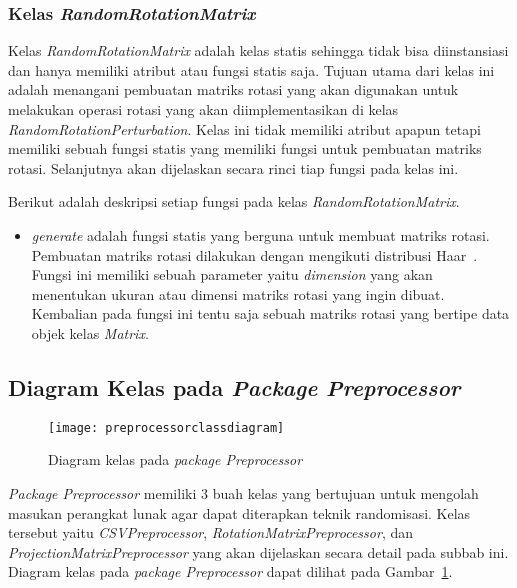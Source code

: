 \subsubsection{Kelas \textit{RandomRotationMatrix}}
\label{subsubsec:kelas-rrm}

Kelas \textit{RandomRotationMatrix} adalah kelas statis sehingga tidak bisa diinstansiasi dan hanya memiliki atribut atau fungsi statis saja. Tujuan utama dari kelas ini adalah menangani pembuatan matriks rotasi yang akan digunakan untuk melakukan operasi rotasi yang akan diimplementasikan di kelas \textit{RandomRotationPerturbation}. Kelas ini tidak memiliki atribut apapun tetapi memiliki sebuah fungsi statis yang memiliki fungsi untuk pembuatan matriks rotasi. Selanjutnya akan dijelaskan secara rinci tiap fungsi pada kelas ini.

Berikut adalah deskripsi setiap fungsi pada kelas \textit{RandomRotationMatrix}.
\begin{itemize}
	\item \textit{generate} adalah fungsi statis yang berguna untuk membuat matriks rotasi. Pembuatan matriks rotasi dilakukan dengan mengikuti distribusi Haar~\cite{stewart:80:orthogonal}. Fungsi ini memiliki sebuah parameter yaitu \textit{dimension} yang akan menentukan ukuran atau dimensi matriks rotasi yang ingin dibuat. Kembalian pada fungsi ini tentu saja sebuah matriks rotasi yang bertipe data objek kelas \textit{Matrix}.
\end{itemize}

\subsection{Diagram Kelas pada \textit{Package Preprocessor}}
\label{subsec:diagram-kelas-preprocessor}

\begin{figure}
	\centering
	\texttt{[image: preprocessorclassdiagram]}
	\caption{Diagram kelas pada \textit{package Preprocessor}}
	\label{fig:preprocessorclassdiagram}
\end{figure}

\textit{Package Preprocessor} memiliki 3 buah kelas yang bertujuan untuk mengolah masukan perangkat lunak agar dapat diterapkan teknik randomisasi. Kelas tersebut yaitu \textit{CSVPreprocessor}, \textit{RotationMatrixPreprocessor}, dan \textit{ProjectionMatrixPreprocessor} yang akan dijelaskan secara detail pada subbab ini. Diagram kelas pada \textit{package Preprocessor} dapat dilihat pada Gambar~\ref{fig:preprocessorclassdiagram}.

